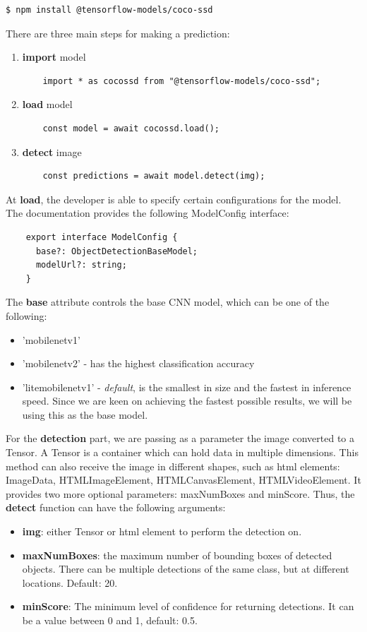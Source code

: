\documentclass[runningheads,a4paper,11pt]{report}
\begin{document}
\begin{lstlisting}[language=bash]
    $ npm install @tensorflow-models/coco-ssd
\end{lstlisting}
There are three main steps for making a prediction:
\begin{enumerate}
  \item \textbf{import} model
  \begin{lstlisting}
    import * as cocossd from "@tensorflow-models/coco-ssd";
  \end{lstlisting}
  \item \textbf{load} model
  \begin{lstlisting}
    const model = await cocossd.load();
  \end{lstlisting}
  \item \textbf{detect} image
  \begin{lstlisting}
    const predictions = await model.detect(img);
  \end{lstlisting}
\end{enumerate}
At \textbf{load}, the developer is able to specify certain configurations for the model. The documentation provides the following ModelConfig interface: 
    \begin{lstlisting}
    export interface ModelConfig {
      base?: ObjectDetectionBaseModel;
      modelUrl?: string;
    }
    \end{lstlisting}
The \textbf{base} attribute controls the base CNN model, which can be one of the following:
\begin{itemize}
  \item 'mobilenet\textunderscore v1' 
  \item 'mobilenet\textunderscore v2' - has the highest classification accuracy
  \item 'lite\textunderscore mobilenet\textunderscore v1' - \textit{default}, is the smallest in size and the fastest in inference speed. Since we are keen on achieving the fastest possible results, we will be using this as the base model.
\end{itemize}

For the \textbf{detection} part, we are passing as a parameter the image converted to a Tensor. A Tensor is a container which can hold data in multiple dimensions. This method can also receive the image in different shapes, such as html elements: ImageData, HTMLImageElement, HTMLCanvasElement, HTMLVideoElement. It provides two more optional parameters: maxNumBoxes and minScore. Thus, the \textbf{detect} function can have the following arguments:
\begin{itemize}
  \item \textbf{img}: either Tensor or html element to perform the detection on.
  \item \textbf{maxNumBoxes}: the maximum number of bounding boxes of detected objects. There can be multiple detections of the same class, but at different locations. Default: 20.
  \item \textbf{minScore}: The minimum level of confidence for returning detections. It can be a value between 0 and 1, default: 0.5. 
\end{itemize}
\end{document}
